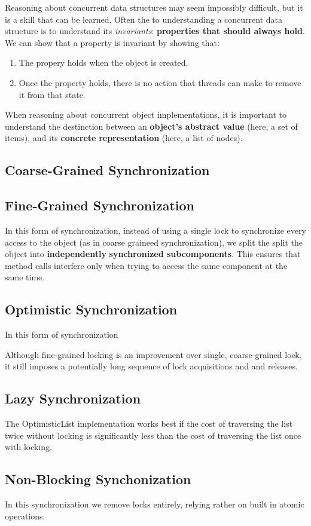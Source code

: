 \documentclass[11pt]{article}
\begin{document}
Reasoning about concurrent data structures may seem impossibly difficult, but it is a skill
that can be learned. Often the to understanding a concurrent data structure is to understand
its \emph{invariants}: \textbf{properties that should always hold}. We can show that a property is 
invariant by showing that:

\begin{enumerate}
\item The propery holds when the object is created.
\item Once the property holds, there is no action that threads can make to remove it from that state.
\end{enumerate}

When reasoning about concurrent object implementations, it is important to understand the 
destinction between an \textbf{object's abstract value} (here, a set of items), and its \textbf{concrete} 
\textbf{representation} (here, a list of nodes).

\subsection{Coarse-Grained Synchronization}
\label{sec:orgheadline22}



\subsection{Fine-Grained Synchronization}
\label{sec:orgheadline23}


In this form of synchronization, instead of using a single lock to synchronize every access to the
object (as in coarse graineed synchronization), we split the split the object into \textbf{independently} 
\textbf{synchronized subcomponents}. This ensures that method calls interfere only when trying to access
the same component at the same time.

\subsection{Optimistic Synchronization}
\label{sec:orgheadline24}

In this form of synchronization

Although fine-grained locking is an improvement over single, coarse-grained lock, it still 
imposes a potentially long sequence of lock acquisitions and and releases.


\subsection{Lazy Synchronization}
\label{sec:orgheadline25}

The OptimisticList implementation works best if the cost of traversing the list twice without
locking is significantly less than the cost of traversing the list once with locking.


\subsection{Non-Blocking Synchonization}
\label{sec:orgheadline26}

In this synchronization we remove locks entirely, relying rather on built in atomic operations.
\end{document}
